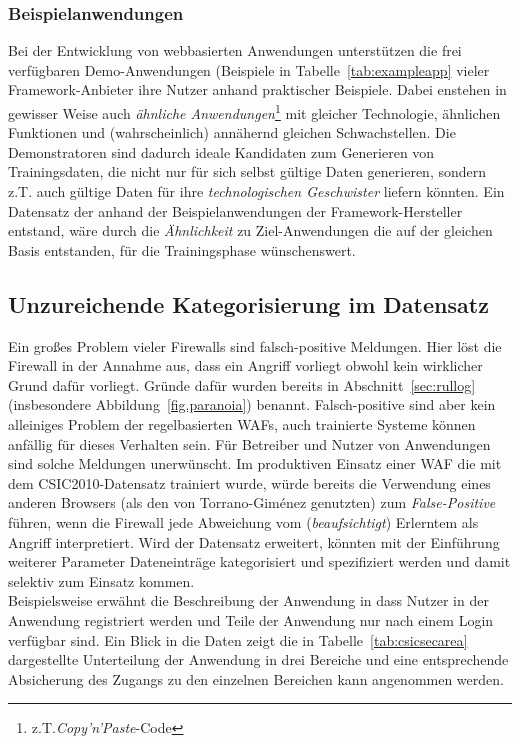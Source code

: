 \subsubsection{Beispielanwendungen}
Bei der Entwicklung von webbasierten Anwendungen unterstützen die frei verfügbaren Demo-Anwendungen (Beispiele in Tabelle~\ref{tab:exampleapp} vieler Framework-Anbieter ihre Nutzer anhand praktischer Beispiele. Dabei enstehen in gewisser Weise auch \emph{ähnliche Anwendungen}\footnote{z.T.\emph{Copy'n'Paste}-Code} mit gleicher Technologie, ähnlichen Funktionen und (wahrscheinlich) annähernd gleichen Schwachstellen. Die Demonstratoren sind dadurch ideale Kandidaten zum Generieren von Trainingsdaten, die nicht nur für sich selbst gültige Daten generieren, sondern z.T. auch gültige Daten für ihre \glqq\emph{technologischen Geschwister}\glqq{} liefern könnten. Ein Datensatz der anhand der Beispielanwendungen der Framework-Hersteller entstand, wäre durch die \glqq\emph{Ähnlichkeit}\grqq{} zu Ziel-Anwendungen die auf der gleichen Basis entstanden, für die Trainingsphase wünschenswert.


\subsection{Unzureichende Kategorisierung im Datensatz}
\label{sec:Kategorisierung}
Ein großes Problem vieler Firewalls sind falsch-positive Meldungen. Hier löst die Firewall in der Annahme aus, dass ein Angriff vorliegt obwohl kein wirklicher Grund dafür vorliegt. Gründe dafür wurden bereits in Abschnitt~\ref{sec:rullog} (insbesondere Abbildung~\ref{fig.paranoia}) benannt. Falsch-positive sind aber kein alleiniges Problem der regelbasierten WAFs, auch trainierte Systeme können anfällig für dieses Verhalten sein. Für Betreiber und Nutzer von Anwendungen sind solche Meldungen unerwünscht. Im produktiven Einsatz einer WAF die mit dem CSIC2010-Datensatz trainiert wurde, würde bereits die Verwendung eines anderen Browsers (als den von Torrano-Giménez genutzten) zum \emph{False-Positive} führen, wenn die Firewall jede Abweichung vom (\emph{beaufsichtigt}) Erlerntem als Angriff interpretiert. Wird der Datensatz erweitert, könnten mit der Einführung weiterer Parameter Dateneinträge kategorisiert und spezifiziert werden und damit selektiv zum Einsatz kommen.\\ Beispielsweise erwähnt die Beschreibung der Anwendung in \cite{csic2010} dass Nutzer in der Anwendung registriert werden und Teile der Anwendung nur nach einem Login verfügbar sind. Ein Blick in die Daten zeigt die in Tabelle~\ref{tab:csicsecarea} dargestellte Unterteilung der Anwendung in drei Bereiche und eine entsprechende Absicherung des Zugangs zu den einzelnen Bereichen kann angenommen werden.\\ 

